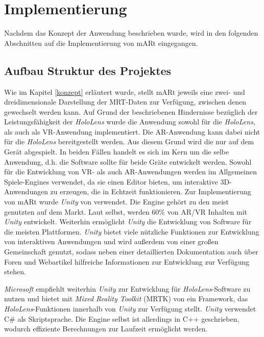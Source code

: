 
\chapter{Implementierung}
\label{implementierung}

Nachdem das Konzept der Anwendung beschrieben wurde, wird in den folgenden Abschnitten auf die Implementierung von mARt eingegangen. 

\section{Aufbau Struktur des Projektes}

Wie im Kapitel \ref{konzept} erläutert wurde, stellt mARt jeweils eine zwei- und dreidimensionale Darstellung der MRT-Daten zur Verfügung, zwischen denen gewechselt werden kann. Auf Grund der beschriebenen Hindernisse bezüglich der Leistungsfähigkeit der \textit{HoloLens} wurde die Anwendung sowohl für die \textit{HoloLens}, als auch als VR-Anwendung implementiert. Die AR-Anwendung kann dabei nicht für die \textit{HoloLens} bereitgestellt werden. Aus diesem Grund wird die nur auf dem Gerät abgespielt. In beiden Fällen handelt es sich im Kern um die selbe Anwendung, d.h. die Software sollte für beide Gräte entwickelt werden. 
Sowohl für die Entwicklung von VR- als auch AR-Anwendungen werden im Allgemeinen Spiele-Engines verwendet, da sie einen Editor bieten, um interaktive 3D-Anwendungen zu erzeugen, die in Echtzeit funktionieren. 
Zur Implementierung von mARt wurde \textit{Unity} von \cite{unity} verwendet. Die Engine gehört zu den meist genutzten auf dem Markt. Laut \cite{unityRelations} selbst, werden 60\% von AR/VR Inhalten mit \textit{Unity} entwickelt. Weiterhin ermöglicht \textit{Unity} die Entwicklung von Software für die meisten Plattformen. \textit{Unity} bietet viele nützliche Funktionen zur Entwicklung von interaktiven Anwendungen und wird außerdem von einer großen  Gemeinschaft genutzt, sodass neben einer detaillierten Dokumentation auch über Foren und Webartikel hilfreiche Informationen zur Entwicklung zur Verfügung stehen.

\textit{Microsoft} empfiehlt weiterhin \textit{Unity} zur Entwicklung für \textit{HoloLens}-Software zu nutzen \cite{unityHololens} und bietet mit \textit{Mixed Reality Toolkit} (MRTK) von \cite{holoToolkit} ein Framework, das \textit{HoloLens}-Funktionen innerhalb von \textit{Unity} zur Verfügung stellt.
\textit{Unity} verwendet C\# als Skriptsprache. Die Engine selbst ist allerdings in C++ geschrieben, wodurch effiziente Berechnungen zur Laufzeit ermöglicht werden.

